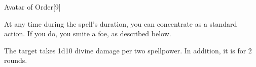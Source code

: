 \begin{spellsection}{Avatar of Order}[9]
    \begin{spellheader}
    \end{spellheader}
    \begin{spellcontent}
        \begin{spelltargetinginfo}
        \end{spelltargetinginfo}
        \begin{spelleffects}
            \spelleffect At any time during the spell's duration, you can concentrate as a standard action. If you do, you smite a foe, as described below.
            \spelldur \durlong
        \end{spelleffects}
    \end{spellcontent}
    \begin{spellsubcontent}
        \begin{spelltargetinginfo}
        \end{spelltargetinginfo}
        \begin{spelleffects}
            \spelleffect The target takes 1d10 divine damage per two spellpower. In addition, it is \slowed for 2 rounds.
        \end{spelleffects}
    \end{spellsubcontent}
    \begin{spellfooter}
        \miscastexplode
    \end{spellfooter}
\end{spellsection}

